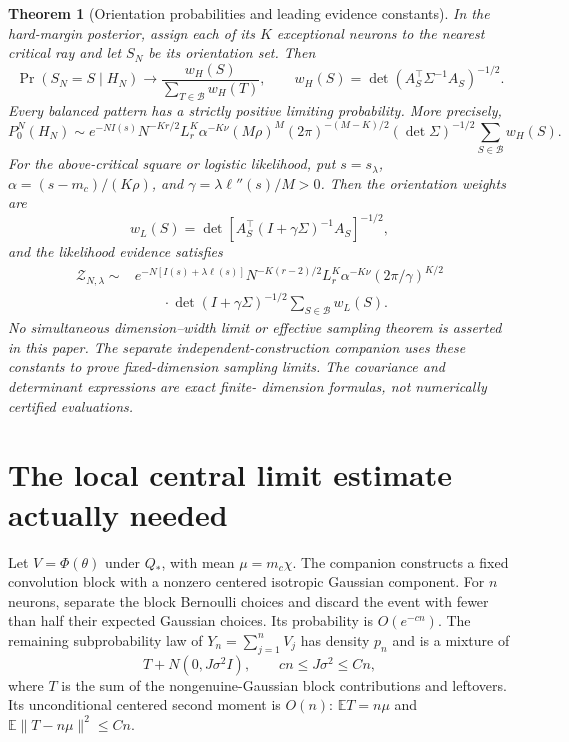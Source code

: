\documentclass[11pt]{article}
\newtheorem{theorem}{Theorem}\newtheorem{lemma}[theorem]{Lemma}
\newcommand{\E}{\mathbb E}\newcommand{\R}{\mathbb R}
\begin{document}
\begin{theorem}[Orientation probabilities and leading evidence constants]
In the hard-margin posterior, assign each of its $K$ exceptional
neurons to the nearest critical ray and let $S_N$ be its orientation
set. Then
\[
 \Pr(S_N=S\mid H_N)\longrightarrow
 \frac{w_H(S)}{\sum_{T\in\mathcal B}w_H(T)},\qquad
 w_H(S)=\det(A_S^\top\Sigma^{-1}A_S)^{-1/2}.
 \tag{1}
\]
Every balanced pattern has a strictly positive limiting probability.
More precisely,
\[
 P_0^N(H_N)\sim e^{-NI(s)}N^{-Kr/2}
 L_r^K\alpha^{-K\nu}(M\rho)^M
 (2\pi)^{-(M-K)/2}(\det\Sigma)^{-1/2}
 \sum_{S\in\mathcal B}w_H(S).\tag{2}
\]
For the above-critical square or logistic likelihood, put
$s=s_\lambda$, $\alpha=(s-m_c)/(K\rho)$, and
$\gamma=\lambda\ell''(s)/M>0$. Then the orientation weights are
\[
 w_L(S)=\det\left[A_S^\top(I+\gamma\Sigma)^{-1}A_S\right]^{-1/2},
 \tag{3}
\]
and the likelihood evidence satisfies
\begin{align*}
 \mathcal Z_{N,\lambda}\sim{}&
 e^{-N[I(s)+\lambda\ell(s)]}N^{-K(r-2)/2}
 L_r^K\alpha^{-K\nu}(2\pi/\gamma)^{K/2}\\
 &\qquad\cdot\det(I+\gamma\Sigma)^{-1/2}
                  \sum_{S\in\mathcal B}w_L(S).\tag{4}
\end{align*}
No simultaneous dimension--width limit or effective sampling theorem is
asserted in this paper. The separate independent-construction companion
uses these constants to prove fixed-dimension sampling limits. The covariance and determinant expressions are exact finite-
dimension formulas, not numerically certified evaluations.
\end{theorem}

\section{The local central limit estimate actually needed}
Let $V=\Phi(\theta)$ under $Q_*$, with mean $\mu=m_c\chi$.
The companion constructs a fixed convolution block with a nonzero
centered isotropic Gaussian component. For $n$ neurons, separate the
block Bernoulli choices and discard the event with fewer than half their
expected Gaussian choices. Its probability is $O(e^{-cn})$.
The remaining subprobability law of $Y_n=\sum_{j=1}^nV_j$ has density
$p_n$ and is a mixture of
\[
 T+N(0,J\sigma^2 I),\qquad cn\le J\sigma^2\le Cn,
\]
where $T$ is the sum of the nongenuine-Gaussian block contributions and
leftovers. Its unconditional centered second moment is $O(n)$:
$\E T=n\mu$ and $\E\|T-n\mu\|^2\le Cn$.
\end{document}
